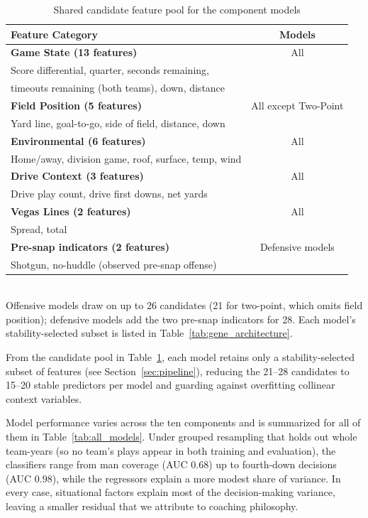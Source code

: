 \documentclass[USenglish]{article}
\theoremstyle{dgthm}
\theoremstyle{dgdef}
\begin{document}
\begin{table}[H]
\caption{Shared candidate feature pool for the component models}
\label{tab:model_features}
\scriptsize
\begin{tabular}{lc}
\toprule
\textbf{Feature Category} & \textbf{Models} \\
\midrule
\textbf{Game State (13 features)} & All \\
\quad Score differential, quarter, seconds remaining, & \\
\quad timeouts remaining (both teams), down, distance & \\
\midrule
\textbf{Field Position (5 features)} & All except Two-Point \\
\quad Yard line, goal-to-go, side of field, distance, down & \\
\midrule
\textbf{Environmental (6 features)} & All \\
\quad Home/away, division game, roof, surface, temp, wind & \\
\midrule
\textbf{Drive Context (3 features)} & All \\
\quad Drive play count, drive first downs, net yards & \\
\midrule
\textbf{Vegas Lines (2 features)} & All \\
\quad Spread, total & \\
\midrule
\textbf{Pre-snap indicators (2 features)} & Defensive models \\
\quad Shotgun, no-huddle (observed pre-snap offense) & \\
\bottomrule
\end{tabular}
\\[2pt]
{\scriptsize Offensive models draw on up to 26 candidates (21 for two-point, which omits field position); defensive models add the two pre-snap indicators for 28. Each model's stability-selected subset is listed in Table~\ref{tab:gene_architecture}.}
\end{table}

From the candidate pool in Table~\ref{tab:model_features}, each model retains only a stability-selected subset of features (see Section~\ref{sec:pipeline}), reducing the 21--28 candidates to 15--20 stable predictors per model and guarding against overfitting collinear context variables.

Model performance varies across the ten components and is summarized for all of them in Table~\ref{tab:all_models}. Under grouped resampling that holds out whole team-years (so no team's plays appear in both training and evaluation), the classifiers range from man coverage (AUC $0.68$) up to fourth-down decisions (AUC $0.98$), while the regressors explain a more modest share of variance. In every case, situational factors explain most of the decision-making variance, leaving a smaller residual that we attribute to coaching philosophy.
\end{document}
